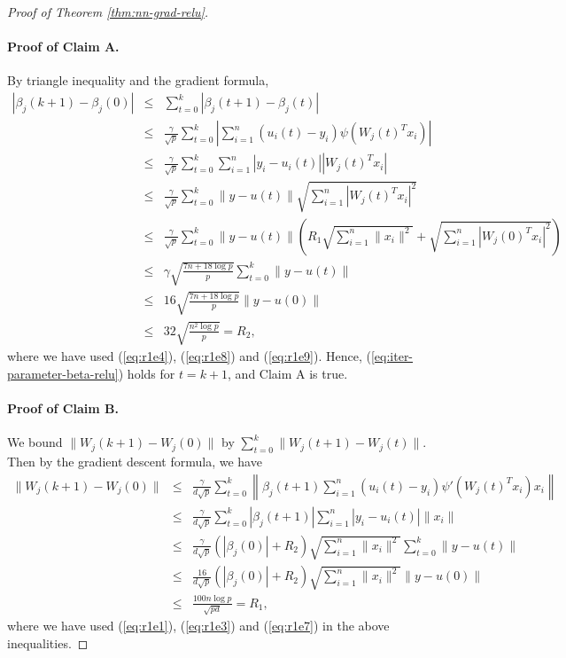 \begin{proof}[Proof of Theorem \ref{thm:nn-grad-relu}]
\paragraph{Proof of Claim A.} 
By triangle inequality and the gradient formula,
\begin{eqnarray*}
|\beta_j(k+1)-\beta_j(0)| &\leq& \sum_{t=0}^k|\beta_j(t+1)-\beta_j(t)| \\
&\leq& \frac{\gamma}{\sqrt{p}}\sum_{t=0}^k\left|\sum_{i=1}^n(u_i(t)-y_i)\psi(W_j(t)^Tx_i)\right| \\
&\leq& \frac{\gamma}{\sqrt{p}}\sum_{t=0}^k\sum_{i=1}^n|y_i-u_i(t)||W_j(t)^Tx_i| \\
&\leq& \frac{\gamma}{\sqrt{p}}\sum_{t=0}^k\|y-u(t)\|\sqrt{\sum_{i=1}^n|W_j(t)^Tx_i|^2} \\
&\leq& \frac{\gamma}{\sqrt{p}}\sum_{t=0}^k\|y-u(t)\|\left(R_1\sqrt{\sum_{i=1}^n\|x_i\|^2}+\sqrt{\sum_{i=1}^n|W_j(0)^Tx_i|^2}\right) \\
&\leq& \gamma\sqrt{\frac{7n+18\log p}{p}}\sum_{t=0}^k\|y-u(t)\| \\
&\leq& 16\sqrt{\frac{7n+18\log p}{p}}\|y-u(0)\| \\
&\leq& 32\sqrt{\frac{n^2\log p}{p}} = R_2,
\end{eqnarray*}
where we have used (\ref{eq:r1e4}), (\ref{eq:r1e8}) and (\ref{eq:r1e9}).
Hence, (\ref{eq:iter-parameter-beta-relu}) holds for $t=k+1$, and Claim A is true.


\paragraph{Proof of Claim B.} We bound $\|W_j(k+1)-W_j(0)\|$ by $\sum_{t=0}^k\|W_j(t+1)-W_j(t)\|$. Then by the gradient descent formula, we have
\begin{eqnarray*}
\|W_j(k+1)-W_j(0)\| &\leq& \frac{\gamma}{d\sqrt{p}}\sum_{t=0}^k\left\|\beta_j(t+1)\sum_{i=1}^n(u_i(t)-y_i)\psi'(W_j(t)^Tx_i)x_i\right\| \\
&\leq& \frac{\gamma}{d\sqrt{p}}\sum_{t=0}^k|\beta_j(t+1)|\sum_{i=1}^n|y_i-u_i(t)|\|x_i\| \\
&\leq& \frac{\gamma}{d\sqrt{p}}(|\beta_j(0)|+R_2)\sqrt{\sum_{i=1}^n\|x_i\|^2}\sum_{t=0}^k\|y-u(t)\| \\
&\leq& \frac{16}{d\sqrt{p}}(|\beta_j(0)|+R_2)\sqrt{\sum_{i=1}^n\|x_i\|^2}\|y-u(0)\| \\
&\leq& \frac{100n\log p}{\sqrt{pd}} = R_1,
\end{eqnarray*}
where we have used (\ref{eq:r1e1}), (\ref{eq:r1e3}) and (\ref{eq:r1e7}) in the above inequalities.


\end{proof}
